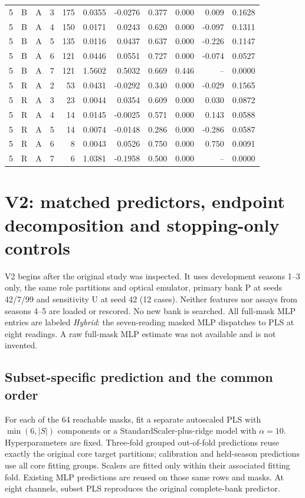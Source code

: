 \documentclass[10pt,a4paper]{article}
\begin{document}
\begin{landscape}
\begin{longtable}{rllrrrrrrrr}
5 & B & A & 3 & 175 & 0.0355 & -0.0276 & 0.377 & 0.000 & 0.009 & 0.1628 \\
5 & B & A & 4 & 150 & 0.0171 & 0.0243 & 0.620 & 0.000 & -0.097 & 0.1311 \\
5 & B & A & 5 & 135 & 0.0116 & 0.0437 & 0.637 & 0.000 & -0.226 & 0.1147 \\
5 & B & A & 6 & 121 & 0.0446 & 0.0551 & 0.727 & 0.000 & -0.074 & 0.0527 \\
5 & B & A & 7 & 121 & 1.5602 & 0.5032 & 0.669 & 0.446 & -- & 0.0000 \\
5 & R & A & 2 & 53 & 0.0431 & -0.0292 & 0.340 & 0.000 & -0.029 & 0.1565 \\
5 & R & A & 3 & 23 & 0.0044 & 0.0354 & 0.609 & 0.000 & 0.030 & 0.0872 \\
5 & R & A & 4 & 14 & 0.0145 & -0.0025 & 0.571 & 0.000 & 0.143 & 0.0588 \\
5 & R & A & 5 & 14 & 0.0074 & -0.0148 & 0.286 & 0.000 & -0.286 & 0.0587 \\
5 & R & A & 6 & 8 & 0.0043 & 0.0526 & 0.750 & 0.000 & 0.750 & 0.0091 \\
5 & R & A & 7 & 6 & 1.0381 & -0.1958 & 0.500 & 0.000 & -- & 0.0000 \\
\end{longtable}
\endgroup
\end{landscape}

\section{V2: matched predictors, endpoint decomposition and stopping-only controls}
V2 begins after the original study was inspected. It uses development seasons 1--3 only, the same role partitions and optical emulator, primary bank P at seeds 42/7/99 and sensitivity U at seed 42 (12 cases). Neither features nor assays from seasons 4--5 are loaded or rescored. No new bank is searched. All full-mask MLP entries are labeled \emph{Hybrid}: the seven-reading masked MLP dispatches to PLS at eight readings. A raw full-mask MLP estimate was not available and is not invented.

\subsection{Subset-specific prediction and the common order}
For each of the 64 reachable masks, fit a separate autoscaled PLS with $\min(6,|S|)$ components or a StandardScaler-plus-ridge model with $\alpha=10$. Hyperparameters are fixed. Three-fold grouped out-of-fold predictions reuse exactly the original core target partitions; calibration and held-season predictions use all core fitting groups. Scalers are fitted only within their associated fitting fold. Existing MLP predictions are reused on those same rows and masks. At eight channels, subset PLS reproduces the original complete-bank predictor.
\end{document}
